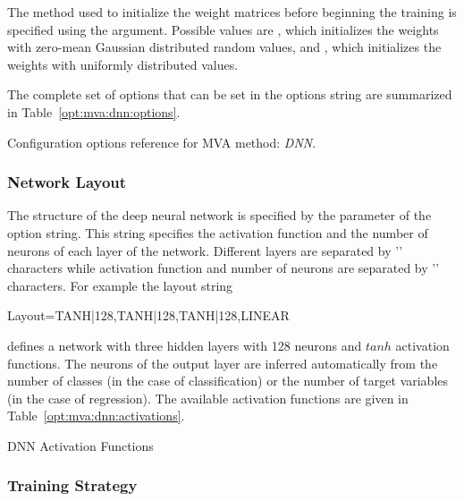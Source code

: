The method used to initialize the weight matrices before beginning the
training is specified using the 
argument. Possible values are , which initializes the
weights with zero-mean Gaussian distributed random values, and
, which initializes the weights with uniformly
distributed values.

The complete set of options that can be set in the options string are summarized in
Table~\ref{opt:mva:dnn:options}.
\begin{option}[h]

\caption[.]{\optionCaptionSize
     Configuration options reference for MVA method: {\em DNN}.
}
\label{opt:mva:dnn:options}
\end{option}

\subsubsection{Network Layout}
\label{sec:dnn:layout}

The structure of the deep neural network is specified by the
 parameter of the option string. This string specifies
the activation function and the number of neurons of each layer of the
network. Different layers are separated by '\code{,}' characters while
activation function and number of neurons are separated by '\code{|}'
characters. For example the layout string

\begin{tmvacode}
  Layout=TANH|128,TANH|128,TANH|128,LINEAR
\end{tmvacode}

defines a network with three hidden layers with 128 neurons and
$tanh$ activation functions. The neurons of the output layer are
inferred automatically from the number of classes (in the case of
classification) or the number of target variables (in the case of
regression). The available activation functions are given in
Table~\ref{opt:mva:dnn:activations}.

\begin{option}[h]

\caption[.]{\optionCaptionSize
     DNN Activation Functions
}
\label{opt:mva:dnn:activations}
\end{option}

\subsubsection{Training Strategy}
\label{sec:dnn:training}


